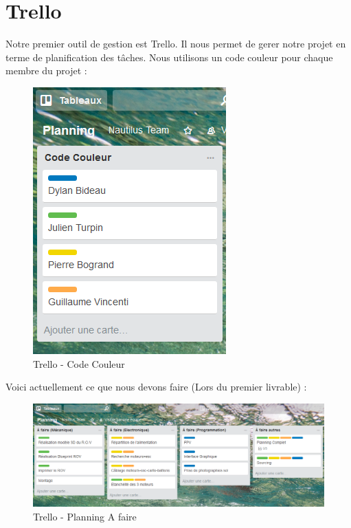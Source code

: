 \documentclass[a4paper,11pt]{report}
\begin{document}
        \section{Trello}
					Notre premier outil de gestion est Trello. Il nous permet de gerer notre projet en terme de planification des tâches. Nous utilisons un code couleur pour chaque membre du projet :
						\begin{figure}[!h]
							\begin{center}
								\includegraphics[scale=0.5]{Illustrations/Couleur.png}
								\caption{Trello - Code Couleur}
							\end{center}
						\end{figure}
						\newline Voici actuellement ce que nous devons faire (Lors du premier livrable) :
						\begin{figure}[!h]
							\begin{center}
								\includegraphics[scale=0.4]{Illustrations/Planning1.png}
								\caption{Trello - Planning A faire}
							\end{center}
						\end{figure}
\end{document}
